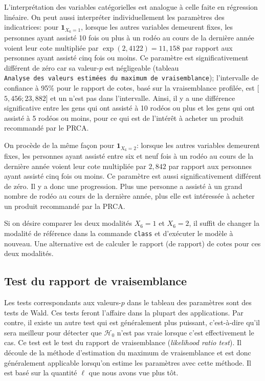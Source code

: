 \documentclass[
  11pt,
  letterpaper,
]{book}
\theoremstyle{definition}
\theoremstyle{definition}
\theoremstyle{definition}
\theoremstyle{remark}
\begin{document}
L'interprétation des variables catégorielles est analogue à celle faite en régression linéaire. On peut aussi interpréter individuellement les paramètres des indicatrices: pour \({\mathbf 1}_{X_6=1}\), lorsque les autres variables demeurent fixes, les personnes ayant assisté 10 fois ou plus à un rodéo au cours de la dernière année voient leur cote multipliée par \(\exp(2,4122)=11,158\) par rapport aux personnes ayant assisté cinq fois ou moins. Ce paramètre est significativement différent de zéro car sa valeur-\(p\) est négligeable (tableau \texttt{Analyse\ des\ valeurs\ estimées\ du\ maximum\ de\ vraisemblance}); l'intervalle de confiance à 95\% pour le rapport de cotes, basé sur la vraisemblance profilée, est {[}\(5,456; 23,882\){]} et un n'est pas dans l'intervalle. Ainsi, il y a une différence significative entre les gens qui ont assisté à 10 rodéos ou plus et les gens qui ont assisté à 5 rodéos ou moins, pour ce qui est de l'intérêt à acheter un produit recommandé par le PRCA.

On procède de la même façon pour \({\mathbf 1}_{X_6=2}\): lorsque les autres variables demeurent fixes, les personnes ayant assisté entre six et neuf fois à un rodéo au cours de la dernière année voient leur cote multipliée par \(2,842\) par rapport aux personnes ayant assisté cinq fois ou moins. Ce paramètre est aussi significativement différent de zéro. Il y a donc une progression. Plus une personne a assisté à un grand nombre de rodéo au cours de la dernière année, plus elle est intéressée à acheter un produit recommandé par la PRCA.

Si on désire comparer les deux modalités \(X_6=1\) et \(X_6=2\), il suffit de changer la modalité de référence dans la commande \texttt{class} et d'exécuter le modèle à nouveau. Une alternative est de calculer le rapport (de rapport) de cotes pour ces deux modalités.

\hypertarget{test-du-rapport-de-vraisemblance}{%
\subsection{Test du rapport de vraisemblance}\label{test-du-rapport-de-vraisemblance}}

Les tests correspondants aux valeurs-\(p\) dans le tableau des paramètres sont des tests de Wald. Ces tests feront l'affaire dans la plupart des applications. Par contre, il existe un autre test qui est généralement plus puissant, c'est-à-dire qu'il sera meilleur pour détecter que \(\mathcal{H}_0\) n'est pas vraie lorsque c'est effectivement le cas. Ce test est le test du rapport de vraisemblance (\emph{likelihood ratio test}). Il découle de la méthode d'estimation du maximum de vraisemblance et est donc généralement applicable lorsqu'on estime les paramètres avec cette méthode. Il est basé sur la quantité \(\ell\) que nous avons vue plus tôt.
\end{document}
